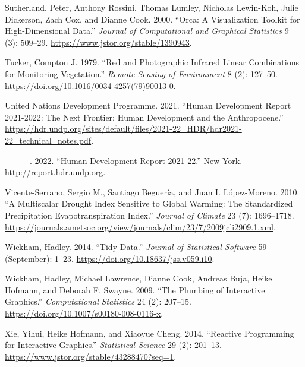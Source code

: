 \documentclass[
]{article}
\newlength{\cslhangindent}
\newlength{\cslentryspacingunit} %
\newenvironment{CSLReferences}[2] %
 {%
  \setlength{\parindent}{0pt}
  \ifodd #1
  \let\oldpar\par
  \def\par{\hangindent=\cslhangindent\oldpar}
  \fi
  \setlength{\parskip}{#2\cslentryspacingunit}
 }%
 {}
\begin{document}
\begin{CSLReferences}{1}{0}
\leavevmode{}%
Sutherland, Peter, Anthony Rossini, Thomas Lumley, Nicholas Lewin-Koh,
Julie Dickerson, Zach Cox, and Dianne Cook. 2000. {``Orca: {A}
{Visualization} {Toolkit} for {High}-{Dimensional} {Data}.''}
\emph{Journal of Computational and Graphical Statistics} 9 (3): 509--29.
\url{https://www.jstor.org/stable/1390943}.

\leavevmode{}%
Tucker, Compton J. 1979. {``Red and Photographic Infrared Linear
Combinations for Monitoring Vegetation.''} \emph{Remote Sensing of
Environment} 8 (2): 127--50.
\url{https://doi.org/10.1016/0034-4257(79)90013-0}.

\leavevmode{}%
United Nations Development Programme. 2021. {``Human Development Report
2021-2022: The Next Frontier: Human Development and the Anthropocene.''}
\url{https://hdr.undp.org/sites/default/files/2021-22_HDR/hdr2021-22_technical_notes.pdf}.

\leavevmode{}%
---------. 2022. {``Human Development Report 2021-22.''} New York.
\url{http://report.hdr.undp.org}.

\leavevmode{}%
Vicente-Serrano, Sergio M., Santiago Beguería, and Juan I. López-Moreno.
2010. {``A {Multiscalar} {Drought} {Index} {Sensitive} to {Global}
{Warming}: {The} {Standardized} {Precipitation} {Evapotranspiration}
{Index}.''} \emph{Journal of Climate} 23 (7): 1696--1718.
\url{https://journals.ametsoc.org/view/journals/clim/23/7/2009jcli2909.1.xml}.

\leavevmode{}%
Wickham, Hadley. 2014. {``Tidy {Data}.''} \emph{Journal of Statistical
Software} 59 (September): 1--23.
\url{https://doi.org/10.18637/jss.v059.i10}.

\leavevmode{}%
Wickham, Hadley, Michael Lawrence, Dianne Cook, Andreas Buja, Heike
Hofmann, and Deborah F. Swayne. 2009. {``The Plumbing of Interactive
Graphics.''} \emph{Computational Statistics} 24 (2): 207--15.
\url{https://doi.org/10.1007/s00180-008-0116-x}.

\leavevmode{}%
Xie, Yihui, Heike Hofmann, and Xiaoyue Cheng. 2014. {``Reactive
{Programming} for {Interactive} {Graphics}.''} \emph{Statistical
Science} 29 (2): 201--13.
\url{https://www.jstor.org/stable/43288470?seq=1}.

\end{CSLReferences}
\end{document}
